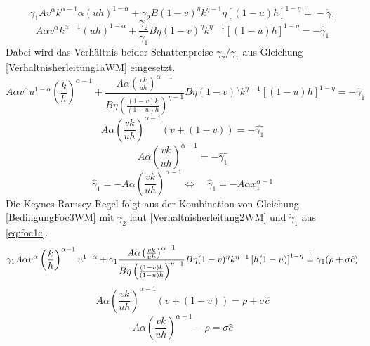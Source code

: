 \begin{equation}
\gamma_{1}A v^{\alpha}k^{\alpha -1} \alpha(u h)^{1- \alpha} + \gamma_{2}B(1- v)^{\eta} k^{\eta -1} \eta \left [ (1-u)h \right ]^{1- \eta}\overset{!}{=} - \dot{\gamma}_{1}\label{BedingungFoc3WM}
\end{equation}
\begin{equation*}
 A \alpha v^{\alpha}k^{\alpha -1} (uh)^{1- \alpha} + \frac{\gamma_{2}}{\gamma_{1}}B\eta (1- v)^{\eta} k^{\eta -1} \left [(1-u)h \right ]^{1- \eta}= - \hat{\gamma}_{1}
\end{equation*}
Dabei wird das Verhältnis beider Schattenpreise $\gamma_2/\gamma_1$ aus Gleichung \eqref{Verhaltnisherleitung1aWM} eingesetzt.
\begin{equation*}
 A \alpha v^{\alpha} {u}^{1- \alpha} \left(\frac{k}{h}\right)^{\alpha -1}+ \frac{A\alpha \left(\frac{vk}{uh}\right)^{\alpha-1}}{B\eta\left(\frac{(1-v)k}{(1-u)h}\right)^{\eta-1}}B\eta (1- v)^{\eta} k^{\eta -1} \left [(1-u)h \right ]^{1- \eta}= - \hat{\gamma}_{1}
\end{equation*}
\begin{equation*}
 A \alpha \left(\frac{vk}{uh}\right)^{\alpha -1}(v+ (1- v))= -\hat{\gamma_{1}}
\end{equation*}
\begin{equation*}
 A \alpha \left(\frac{vk}{uh}\right)^{\alpha -1} = - \hat{\gamma_{1}}
\end{equation*}
\begin{equation}
\hat{\gamma}_1=-A\alpha \left(\frac{vk}{uh}\right)^{\alpha-1}\Longleftrightarrow \quad \hat{\gamma}_1=-A\alpha x_1^{\alpha-1}\label{foc3}
\end{equation}
Die Keynes-Ramsey-Regel folgt aus der Kombination von Gleichung \eqref{BedingungFoc3WM} mit $\gamma_2$ laut \eqref{Verhaltnisherleitung2WM} und $\dot{\gamma}_1$ aus \eqref{eq:foc1c}.
\begin{equation}
\gamma_{1}A \alpha v^{\alpha} \left(\frac{k}{h}\right)^{\alpha -1} u^{1- \alpha}+\gamma_1\frac{A\alpha \left(\frac{vk}{uh}\right)^{\alpha-1}}{B\eta\left(\frac{(1-v)k}{(1-u)h}\right)^{\eta-1}}{B\eta (1- v)^{\eta} k^{\eta-1} \left [ h(1-u) \right ]^{1- \eta}}\overset{!}{=} \gamma_{1}(\rho+\sigma\hat{c})\\
\end{equation}
\begin{equation*}
A \alpha \left(\frac{vk}{uh}\right)^{\alpha -1}(v+(1-v))= \rho+\sigma\hat{c}
\end{equation*}
\begin{equation*}
A \alpha \left(\frac{vk}{uh}\right)^{\alpha -1}- \rho = \sigma \hat{c}
\end{equation*}
